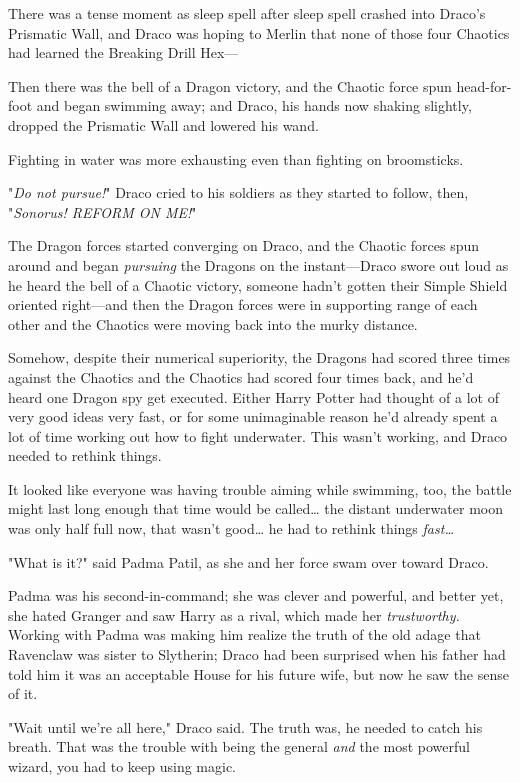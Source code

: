 There was a tense moment as sleep spell after sleep spell crashed into Draco's
Prismatic Wall, and Draco was hoping to Merlin that none of those four Chaotics
had learned the Breaking Drill Hex---

Then there was the bell of a Dragon victory, and the Chaotic force spun
head-for-foot and began swimming away; and Draco, his hands now shaking
slightly, dropped the Prismatic Wall and lowered his wand.

Fighting in water was more exhausting even than fighting on broomsticks.

"\emph{Do not pursue!}" Draco cried to his soldiers as they started to follow,
then, "\emph{Sonorus! REFORM ON ME!}"

The Dragon forces started converging on Draco, and the Chaotic forces spun
around and began \emph{pursuing} the Dragons on the instant---Draco swore out
loud as he heard the bell of a Chaotic victory, someone hadn't gotten their
Simple Shield oriented right---and then the Dragon forces were in supporting
range of each other and the Chaotics were moving back into the murky distance.

Somehow, despite their numerical superiority, the Dragons had scored three
times against the Chaotics and the Chaotics had scored four times back, and
he'd heard one Dragon spy get executed. Either Harry Potter had thought of a
lot of very good ideas very fast, or for some unimaginable reason he'd already
spent a lot of time working out how to fight underwater. This wasn't working,
and Draco needed to rethink things.

It looked like everyone was having trouble aiming while swimming, too, the
battle might last long enough that time would be called{\ldots} the distant
underwater moon was only half full now, that wasn't good{\ldots} he had to
rethink things \emph{fast{\ldots}}

"What is it?" said Padma Patil, as she and her force swam over toward Draco.

Padma was his second-in-command; she was clever and powerful, and better yet,
she hated Granger and saw Harry as a rival, which made her \emph{trustworthy.}
Working with Padma was making him realize the truth of the old adage that
Ravenclaw was sister to Slytherin; Draco had been surprised when his father had
told him it was an acceptable House for his future wife, but now he saw the
sense of it.

"Wait until we're all here," Draco said. The truth was, he needed to catch his
breath. That was the trouble with being the general \emph{and} the most
powerful wizard, you had to keep using magic.

